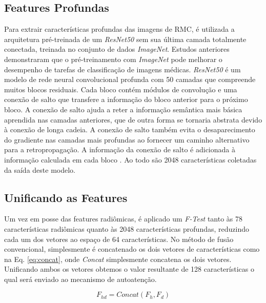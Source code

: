 
\subsection{Features Profundas}
\label{subsec:cap4_features_profundas}
 
Para extrair características profundas das imagens de \gls{RMC}, é utilizada a arquitetura pré-treinada de um \textit{ResNet50} sem sua última camada totalmente conectada, treinada no conjunto de dados \textit{ImageNet}. Estudos anteriores demonstraram que o pré-treinamento com \textit{ImageNet} pode melhorar o desempenho de tarefas de classificação de imagens médicas. \textit{ResNet50} é um modelo de rede neural convolucional profunda com 50 camadas que compreende muitos blocos residuais. Cada bloco contém módulos de convolução e uma conexão de salto que transfere a informação do bloco anterior para o próximo bloco. A conexão de salto ajuda a reter a informação semântica mais básica aprendida nas camadas anteriores, que de outra forma se tornaria abstrata devido à conexão de longa cadeia. A conexão de salto também evita o desaparecimento do gradiente nas camadas mais profundas ao fornecer um caminho alternativo para a retropropagação. A informação da conexão de salto é adicionada à informação calculada em cada bloco \cite{aiSelfAttentionBasedFusion2023}. Ao todo são 2048 características coletadas da saída deste modelo.

\subsection{Unificando as Features}
\label{subsec:cap4_unificando_features}

Um vez em posse das features radiômicas, é aplicado um \textit{F-Test} tanto às 78 características radiômicas quanto às 2048 características profundas, reduzindo cada um dos vetores ao espaço de 64 características. No método de fusão convencional, simplesmente é concatenado os dois vetores de características como na Eq. \ref{eq:concat}, onde \textit{Concat} simplesmente concatena os dois vetores. Unificando ambos os vetores obtemos o valor resultante de 128 características o qual será enviado ao mecanismo de autoatenção.

\begin{equation}
F_{hd} = \textit{Concat}(F_h, F_d)
\label{eq:concat}
\end{equation}

